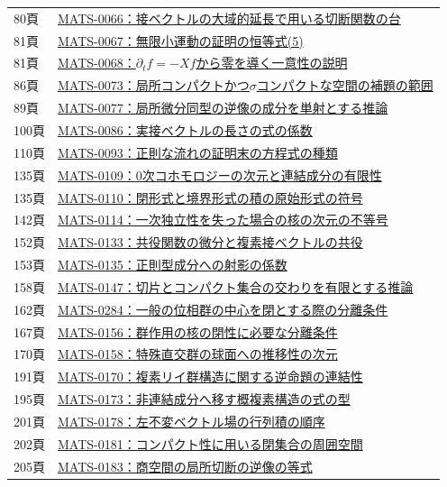 \documentclass[a4paper,10pt]{ltjsarticle}
\begin{document}
\begin{longtable}{@{}p{.14\linewidth}p{.82\linewidth}@{}}
80頁 & \hyperref[math:MATS-0066]{MATS-0066：接ベクトルの大域的延長で用いる切断関数の台} \\
81頁 & \hyperref[math:MATS-0067]{MATS-0067：無限小運動の証明の恒等式(5)} \\
81頁 & \hyperref[math:MATS-0068]{MATS-0068：$\partial_t f=-Xf$から零を導く一意性の説明} \\
86頁 & \hyperref[math:MATS-0073]{MATS-0073：局所コンパクトかつ$\sigma$コンパクトな空間の補題の範囲} \\
89頁 & \hyperref[math:MATS-0077]{MATS-0077：局所微分同型の逆像の成分を単射とする推論} \\
100頁 & \hyperref[math:MATS-0086]{MATS-0086：実接ベクトルの長さの式の係数} \\
110頁 & \hyperref[math:MATS-0093]{MATS-0093：正則な流れの証明末の方程式の種類} \\
135頁 & \hyperref[math:MATS-0109]{MATS-0109：0次コホモロジーの次元と連結成分の有限性} \\
135頁 & \hyperref[math:MATS-0110]{MATS-0110：閉形式と境界形式の積の原始形式の符号} \\
142頁 & \hyperref[math:MATS-0114]{MATS-0114：一次独立性を失った場合の核の次元の不等号} \\
152頁 & \hyperref[math:MATS-0133]{MATS-0133：共役関数の微分と複素接ベクトルの共役} \\
153頁 & \hyperref[math:MATS-0135]{MATS-0135：正則型成分への射影の係数} \\
158頁 & \hyperref[math:MATS-0147]{MATS-0147：切片とコンパクト集合の交わりを有限とする推論} \\
162頁 & \hyperref[math:MATS-0284]{MATS-0284：一般の位相群の中心を閉とする際の分離条件} \\
167頁 & \hyperref[math:MATS-0156]{MATS-0156：群作用の核の閉性に必要な分離条件} \\
170頁 & \hyperref[math:MATS-0158]{MATS-0158：特殊直交群の球面への推移性の次元} \\
191頁 & \hyperref[math:MATS-0170]{MATS-0170：複素リイ群構造に関する逆命題の連結性} \\
195頁 & \hyperref[math:MATS-0173]{MATS-0173：非連結成分へ移す概複素構造の式の型} \\
201頁 & \hyperref[math:MATS-0178]{MATS-0178：左不変ベクトル場の行列積の順序} \\
202頁 & \hyperref[math:MATS-0181]{MATS-0181：コンパクト性に用いる閉集合の周囲空間} \\
205頁 & \hyperref[math:MATS-0183]{MATS-0183：商空間の局所切断の逆像の等式} \\

\end{longtable}
\end{document}
